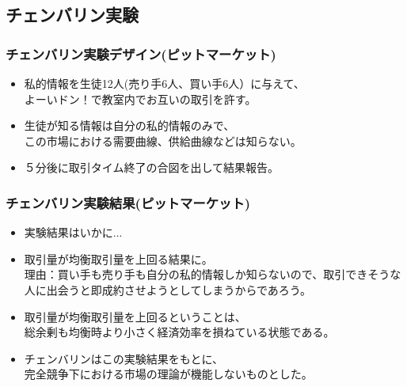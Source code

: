 \documentclass[dvipdfmx,12pt]{beamer}
\begin{document}
\subsection{チェンバリン実験}
\begin{frame}
\frametitle{チェンバリン実験デザイン(ピットマーケット)}
\begin{itemize}\setlength{\parskip}{0.5em}
\item
私的情報を生徒12人(売り手6人、買い手6人）に与えて、\\
よーいドン！で教室内でお互いの取引を許す。\pause
\item
生徒が知る情報は自分の私的情報のみで、\\
この市場における需要曲線、供給曲線などは知らない。\pause
\item
５分後に取引タイム終了の合図を出して結果報告。
\end{itemize}
\end{frame}

\begin{frame}
\frametitle{チェンバリン実験結果(ピットマーケット)}
\begin{itemize}\setlength{\parskip}{0.5em}
\item
実験結果はいかに...\pause
\item
取引量が均衡取引量を上回る結果に。\\
理由：買い手も売り手も自分の私的情報しか知らないので、取引できそうな人に出会うと即成約させようとしてしまうからであろう。\pause
\item
取引量が均衡取引量を上回るということは、\\
総余剰も均衡時より小さく経済効率を損ねている状態である。\pause
\item
チェンバリンはこの実験結果をもとに、\\
完全競争下における市場の理論が機能しないものとした。
\end{itemize}
\end{frame}
\end{document}
